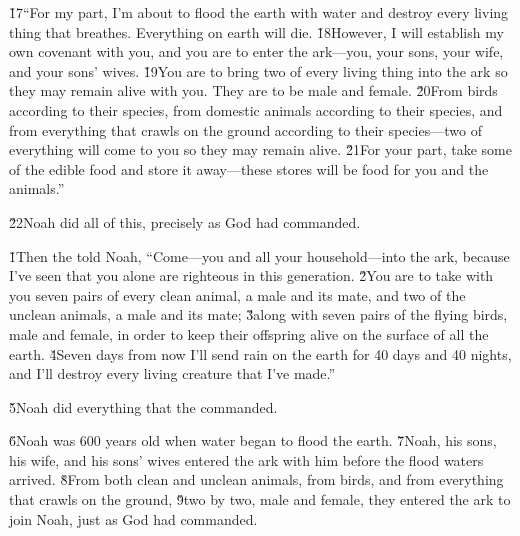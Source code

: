 \v{17}``For my part, I'm about to flood the earth with water and destroy every living thing that breathes. Everything on earth will die. \v{18}However, I will establish my own covenant with you, and you are to enter the ark---you, your sons, your wife, and your sons' wives. \v{19}You are to bring two of every living thing into the ark so they may remain alive with you. They are to be male and female. \v{20}From birds according to their species, from domestic animals according to their species, and from everything that crawls on the ground according to their species---two of everything will come to you so they may remain alive. \v{21}For your part, take some of the edible food and store it away---these stores will be food for you and the animals.''

\v{22}Noah did all of this, precisely as God had commanded.

\v{1}Then the  told Noah, ``Come---you and all your household---into the ark, because I've seen that you alone are righteous in this generation. \v{2}You are to take with you seven pairs of every clean animal, a male and its mate, and two of the unclean animals, a male and its mate; \v{3}along with seven pairs of the flying birds, male and female, in order to keep their offspring alive on the surface of all the earth. \v{4}Seven days from now I'll send rain on the earth for 40 days and 40 nights, and I'll destroy every living creature that I've made.''

\v{5}Noah did everything that the  commanded.

\v{6}Noah was 600 years old when water began to flood the earth. \v{7}Noah, his sons, his wife, and his sons' wives entered the ark with him before the flood waters arrived. \v{8}From both clean and unclean animals, from birds, and from everything that crawls on the ground, \v{9}two by two, male and female, they entered the ark to join Noah, just as God had commanded.

